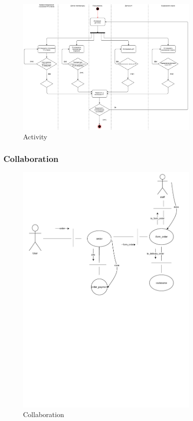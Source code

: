 \documentclass[a4paper,8pt]{article}
\begin{document}
    \begin{figure}[h!]
        \includegraphics[width=0.8\textwidth]{./pics/activity.pdf}
        \caption {Activity}
        \centering
    \end{figure}

\subsubsection{Collaboration}

    \begin{figure}[h!]
        \includegraphics[width=0.8\textwidth]{./pics/collaboration.pdf}
        \caption {Collaboration}
        \centering
    \end{figure}
\end{document}
